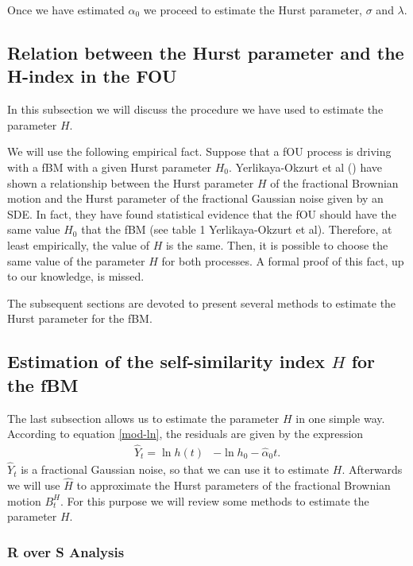 \documentclass[smallextended]{svjour3}
\begin{document}
Once we have estimated $\alpha_0$ we proceed to estimate the Hurst parameter,
$\sigma$ and $\lambda$.

\subsection{Relation between the Hurst parameter and the H-index in the FOU}

        In this subsection we will discuss the procedure we have used to
    estimate the parameter $H$.

        We will use the following empirical fact. Suppose that a fOU process is
    driving with a fBM with a given Hurst parameter $H_0$.  Yerlikaya-Okzurt
    et al (\cite{ye-etal})  have shown a relationship between the Hurst
    parameter $H$ of the fractional Brownian motion and the Hurst parameter
    of the fractional Gaussian noise given by an SDE. In fact, they have
    found statistical evidence that the fOU should have the same value $H_0$
    that the fBM (see table 1 Yerlikaya-Okzurt et al). Therefore, at least
    empirically, the value of $H$ is the same. Then, it is possible to
    choose the same value of the parameter $H$ for both processes.  A formal
    proof of this fact, up to our knowledge, is missed.


        The subsequent sections are devoted to present several methods to
    estimate the Hurst parameter for the fBM.


\subsection{Estimation of the self-similarity index $H$ for the fBM}
\label{Desc-Est-H}

The last subsection allows us to estimate the parameter $H$ in one simple way.
According to equation \eqref{mod-ln}, the residuals are given
by the expression
\begin{align*}
\hat Y_t= \ln h(t)&-\ln h_0 -\widehat \alpha_0t.
\end{align*}
$\hat Y_t$ is a fractional Gaussian noise, so that we can use it to estimate $
H$. Afterwards we will use  $\hat H$ to approximate
the Hurst parameters of the fractional Brownian motion $B_t^H$.
For this purpose we will review some methods to estimate
the parameter $H$.


\subsubsection{R over S Analysis}
\end{document}
